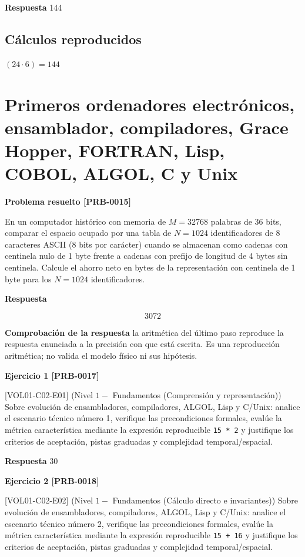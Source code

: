 \documentclass{book}
\begin{document}
\noindent\textbf{Respuesta} 144

\subsection*{Cálculos reproducidos}

\(\left(24\cdot 6\right) = 144\)

\section{Primeros ordenadores electrónicos, ensamblador, compiladores, Grace Hopper, FORTRAN, Lisp, COBOL, ALGOL, C y Unix}

\noindent\textbf{Problema resuelto [PRB-0015]}

En un computador histórico con memoria de \(M = 32768\) palabras de 36 bits, comparar el espacio ocupado por una tabla de \(N = 1024\) identificadores de 8 caracteres ASCII (8 bits por carácter) cuando se almacenan como cadenas con centinela nulo de 1 byte frente a cadenas con prefijo de longitud de 4 bytes sin centinela. Calcule el ahorro neto en bytes de la representación con centinela de 1 byte para los \(N = 1024\) identificadores.

\noindent\textbf{Respuesta}

\[
3072
\]

\noindent\textbf{Comprobación de la respuesta} la aritmética del último paso reproduce la respuesta enunciada a la precisión con que está escrita. Es una reproducción aritmética; no valida el modelo físico ni sus hipótesis.

\noindent\textbf{Ejercicio 1 [PRB-0017]}

[VOL01-C02-E01] (Nivel \(1 -\) Fundamentos (Comprensión y representación)) Sobre evolución de ensambladores, compiladores, ALGOL, Lisp y C/Unix: analice el escenario técnico número 1, verifique las precondiciones formales, evalúe la métrica característica mediante la expresión reproducible \texttt{15 * 2} y justifique los criterios de aceptación, pistas graduadas y complejidad temporal/espacial.

\noindent\textbf{Respuesta} 30

\noindent\textbf{Ejercicio 2 [PRB-0018]}

[VOL01-C02-E02] (Nivel \(1 -\) Fundamentos (Cálculo directo e invariantes)) Sobre evolución de ensambladores, compiladores, ALGOL, Lisp y C/Unix: analice el escenario técnico número 2, verifique las precondiciones formales, evalúe la métrica característica mediante la expresión reproducible \texttt{15 + 16} y justifique los criterios de aceptación, pistas graduadas y complejidad temporal/espacial.
\end{document}

